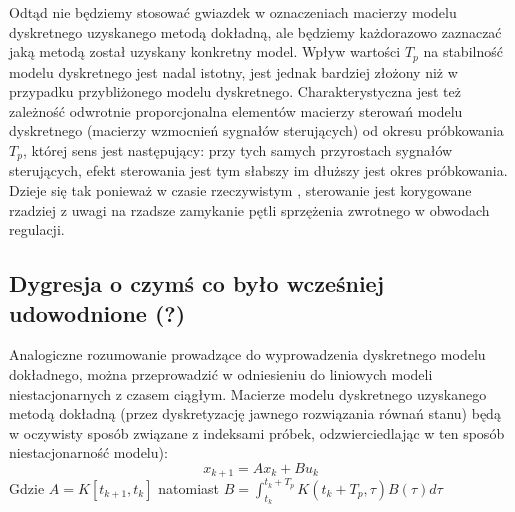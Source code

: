 \documentclass{article}
\begin{document}
		Odtąd nie będziemy stosować gwiazdek w oznaczeniach macierzy modelu dyskretnego
		uzyskanego metodą dokładną, ale będziemy każdorazowo zaznaczać jaką metodą został
		uzyskany konkretny model. Wpływ wartości $T_p$ na stabilność modelu dyskretnego jest
		nadal istotny, jest jednak bardziej złożony niż w przypadku przybliżonego modelu
		dyskretnego. Charakterystyczna jest też zależność odwrotnie proporcjonalna elementów
		macierzy sterowań modelu dyskretnego (macierzy wzmocnień sygnałów sterujących)
		od okresu próbkowania $T_p$, której sens jest następujący: przy tych samych przyrostach
		sygnałów sterujących, efekt sterowania jest tym
		słabszy im dłuższy jest okres próbkowania. Dzieje się tak ponieważ w czasie rzeczywistym
		, sterowanie jest
		korygowane rzadziej z uwagi na rzadsze zamykanie pętli sprzężenia zwrotnego w
		obwodach regulacji.
		\subsection{Dygresja o czymś co było wcześniej udowodnione (?)}
			Analogiczne rozumowanie prowadzące do wyprowadzenia dyskretnego modelu
			dokładnego, można przeprowadzić w odniesieniu do liniowych modeli niestacjonarnych
			z czasem ciągłym. Macierze modelu dyskretnego uzyskanego metodą dokładną (przez
			dyskretyzację jawnego rozwiązania równań stanu) będą w oczywisty sposób związane z
			indeksami próbek, odzwierciedlając w ten sposób niestacjonarność modelu):
			\begin{equation}
				x_{k+1} = Ax_k + Bu_k
			\end{equation}
			Gdzie $A = K[t_{k+1}, t_k]$ natomiast $B = \int_{t_k}^{t_k+T_p}K(t_k+T_p,\tau)B(\tau)d\tau$
\end{document}
